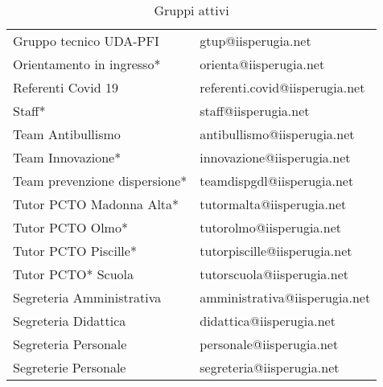 \begin{table}
\begin{tabular}{ll}
Gruppo tecnico UDA-PFI&
gtup@iisperugia.net\\
Orientamento in ingresso*&
orienta@iisperugia.net\\
Referenti Covid 19&
referenti.covid@iisperugia.net\\
Staff*&
staff@iisperugia.net\\
Team Antibullismo &
antibullismo@iisperugia.net\\
Team Innovazione*&
innovazione@iisperugia.net\\
Team prevenzione dispersione*&
teamdispgdl@iisperugia.net\\
Tutor PCTO Madonna Alta*&
tutormalta@iisperugia.net\\
Tutor PCTO Olmo*&
tutorolmo@iisperugia.net\\
Tutor PCTO Piscille* &
tutorpiscille@iisperugia.net\\
Tutor PCTO* Scuola&
tutorscuola@iisperugia.net\\
Segreteria Amministrativa&amministrativa@iisperugia.net	\\
Segreteria Didattica&didattica@iisperugia.net	\\
Segreteria Personale&personale@iisperugia.net	\\
Segreterie Personale&segreteria@iisperugia.net	\\
\midrule
\end{tabular}
\caption{Gruppi attivi}
\label{tab:GruppiAttivi}
\end{table}
